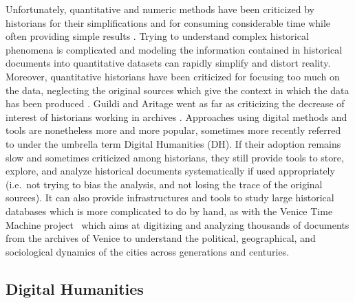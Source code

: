 Unfortunately, quantitative and numeric methods have been criticized by historians for their simplifications and for consuming considerable time while often providing simple results \cite{karila-cohenNouvellesCuisinesHistoire2018,lepetitHistoireQuantitativeDeux1989}.
Trying to understand complex historical phenomena is complicated and modeling the information contained in historical documents into quantitative datasets can rapidly simplify and distort reality.
Moreover, quantitative historians have been criticized for focusing too much on the data, neglecting the original sources which give the context in which the data has been produced \cite{lemercierQuantitativeMethodsHumanities2019}.
Guildi and Aritage went as far as criticizing the decrease of interest of historians working in archives \cite{guldiHistoryManifesto2014}.
Approaches using digital methods and tools are nonetheless more and more popular, sometimes more recently referred to under the umbrella term Digital Humanities (DH).
If their adoption remains slow and sometimes criticized among historians, they still provide tools to store, explore, and analyze historical documents systematically if used appropriately (i.e.\ not trying to bias the analysis, and not losing the trace of the original sources).
It can also provide infrastructures and tools to study large historical databases which is more complicated to do by hand, as with the Venice Time Machine project~\cite{kaplanVeniceTimeMachine2015} which aims at digitizing and analyzing thousands of documents from the archives of Venice to understand the political, geographical, and sociological dynamics of the cities across generations and centuries.



\subsection{Digital Humanities}\label{subsec:DH}

